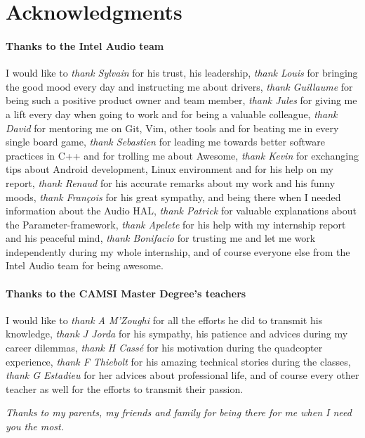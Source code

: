 \chapter*{Acknowledgments}

\subsubsection*{Thanks to the Intel Audio team}
I would like to
\emph{thank Sylvain} for his trust, his leadership,
\emph{thank Louis} for bringing the good mood every day and instructing me about drivers,
\emph{thank Guillaume} for being such a positive product owner and team member,
\emph{thank Jules} for giving me a lift every day when going to work and for being a valuable colleague,
\emph{thank David} for mentoring me on Git, Vim, other tools and for beating me in every single board game,
\emph{thank Sebastien} for leading me towards better software practices in C++ and for trolling me about Awesome,
\emph{thank Kevin} for exchanging tips about Android development, Linux environment and for his help on my report,
\emph{thank Renaud} for his accurate remarks about my work and his funny moods,
\emph{thank François} for his great sympathy, and being there when I needed information about the Audio HAL,
\emph{thank Patrick} for valuable explanations about the Parameter-framework,
\emph{thank Apelete} for his help with my internship report and his peaceful mind,
\emph{thank Bonifacio} for trusting me and let me work independently during my whole internship,
and of course everyone else from the Intel Audio team for being awesome.

\subsubsection*{Thanks to the CAMSI Master Degree's teachers}
I would like to
\emph{thank A M'Zoughi} for all the efforts he did to transmit his knowledge,
\emph{thank J Jorda} for his sympathy, his patience and advices during my career dilemmas,
\emph{thank H Cassé} for his motivation during the quadcopter experience,
\emph{thank F Thiebolt} for his amazing technical stories during the classes,
\emph{thank G Estadieu} for her advices about professional life,
and of course every other teacher as well for the efforts to transmit their passion.

\vfill

\begin{minipage}{0.49\textwidth}
\begin{flushright}
\end{flushright}
\end{minipage}
\begin{minipage}{0.49\textwidth}
\begin{flushleft}
  \emph{Thanks to my parents, my friends and family for being there for me when I need you the most.}
\end{flushleft}
\end{minipage}

